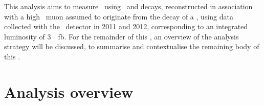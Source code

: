 This analysis aims to measure \dACP\ using \LcTopKK\ and \LcToppipi decays, 
reconstructed in association with a high \pT\ muon assumed to originate from 
the decay of a \PLambdab, using data collected with the \lhcb\ detector in 2011 
and 2012, corresponding to an integrated luminosity of \SI{3}{\per\femto\barn}.
For the remainder of this , an overview of the 
analysis strategy will be discussed, to summarise and contextualise the 
remaining body of this .



\section{Analysis overview}
\label{chap:cpv:introduction:overview}

